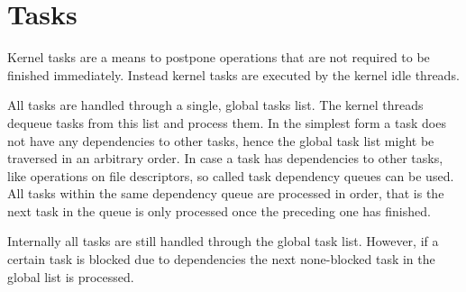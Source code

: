 \section{Tasks}
Kernel tasks are a means to postpone operations that are not required to be finished immediately. Instead kernel tasks are executed by the kernel idle threads.

All tasks are handled through a single, global tasks list. The kernel threads dequeue tasks from this list and process them. In the simplest form a task does not have any dependencies to other tasks, hence the global task list might be traversed in an arbitrary order. In case a task has dependencies to other tasks, like operations on file descriptors, so called task dependency queues can be used. All tasks within the same dependency queue are processed in order, that is the next task in the queue is only processed once the preceding one has finished.

Internally all tasks are still handled through the global task list. However, if a certain task is blocked due to dependencies the next none-blocked task in the global list is processed.
